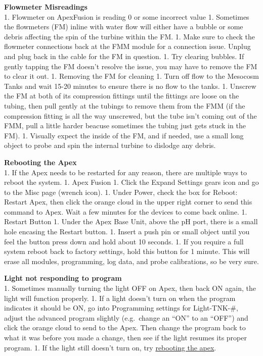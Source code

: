 \documentclass[]{book}
\begin{document}
 \textbf{Flowmeter Misreadings}\\
1. Flowmeter on ApexFusion is reading 0 or some incorrect value 1.
Sometimes the flowmeters (FM) inline with water flow will either have a
bubble or some debris affecting the spin of the turbine within the FM.
1. Make sure to check the flowmeter connections back at the FMM module
for a connection issue. Unplug and plug back in the cable for the FM in
question. 1. Try clearing bubbles. If gently tapping the FM doesn't
resolve the issue, you may have to remove the FM to clear it out. 1.
Removing the FM for cleaning 1. Turn off flow to the Mesocosm Tanks and
wait 15-20 minutes to ensure there is no flow to the tanks. 1. Unscrew
the FM at both of its compression fittings until the fittings are loose
on the tubing, then pull gently at the tubings to remove them from the
FMM (if the compression fitting is all the way unscrewed, but the tube
isn't coming out of the FMM, pull a little harder beacuse sometimes the
tubing just gets stuck in the FM). 1. Visually expect the inside of the
FM, and if needed, use a small long object to probe and spin the
internal turbine to dislodge any debris.

 \textbf{Rebooting the Apex}\\
1. If the Apex needs to be restarted for any reason, there are multiple
ways to reboot the system. 1. Apex Fusion 1. Click the Expand Settings
gears icon and go to the Misc page (wrench icon). 1. Under Power, check
the box for Reboot: Restart Apex, then click the orange cloud in the
upper right corner to send this command to Apex. Wait a few minutes for
the devices to come back online. 1. Restart Button 1. Under the Apex
Base Unit, above the pH port, there is a small hole encasing the Restart
button. 1. Insert a push pin or small object until you feel the button
press down and hold about 10 seconds. 1. If you require a full system
reboot back to factory settings, hold this button for 1 minute. This
will erase all modules, programming, log data, and probe calibrations,
so be very sure.

 \textbf{Light not responding to program}\\
1. Sometimes manually turning the light OFF on Apex, then back ON again,
the light will function properly. 1. If a light doesn't turn on when the
program indicates it should be ON, go into Programming settings for
Light-TNK-\#, adjust the advanced program slightly (e.g.~change an
``ON'' to an ``OFF'') and click the orange cloud to send to the Apex.
Then change the program back to what it was before you made a change,
then see if the light resumes its proper program. 1. If the light still
doesn't turn on, try \protect\hyperlink{Reboot_Apex}{rebooting the
apex}.
\end{document}

